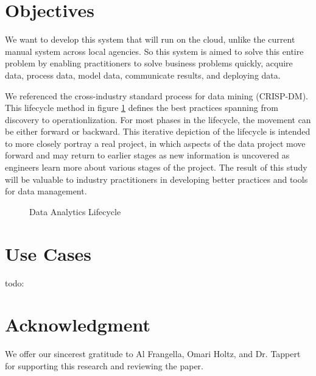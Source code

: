 \documentclass[conference]{IEEEtran}
\begin{document}
\section{Objectives}
We want to develop this system that will run on the cloud, unlike the current manual system across local agencies. So this system is aimed to solve this entire problem by enabling practitioners to solve business problems quickly, acquire data, process data, model data, communicate results, and deploying data.

We referenced the cross-industry standard process for data mining (CRISP-DM\cite{crisp}).  This lifecycle method in figure \ref{fig:dataflow} defines the best practices spanning from discovery to operationlization.  For most phases in the lifecycle, the movement can be either forward or backward. This iterative depiction of the lifecycle is intended to more closely portray a real project, in which aspects of the data project move forward and may return to earlier stages as new information is uncovered as engineers learn more about various stages of the project\cite{EMC}.  The result of this study will be valuable to industry practitioners in developing better practices and tools for data management.

\begin{figure}[bth]
	\centering
	\caption{Data Analytics Lifecycle}
	\label{fig:dataflow}
\end{figure}

\section{Use Cases}
todo:

\section{Acknowledgment}
We offer our sincerest gratitude to Al Frangella, Omari Holtz, and Dr. Tappert for supporting this research and reviewing the paper.


{\small}
 
\end{document}
